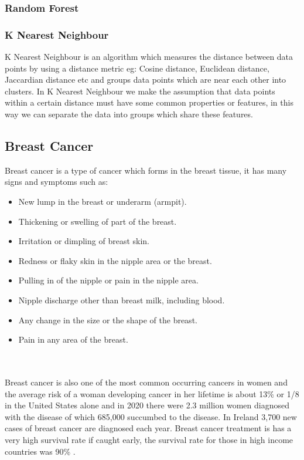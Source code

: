 \documentclass[conference]{IEEEtran}
\begin{document}
\subsubsection{Random Forest}
\subsubsection{K Nearest Neighbour}
K Nearest Neighbour is an algorithm which measures the distance between data points by using a distance metric eg: Cosine distance, Euclidean distance, Jaccardian distance etc and groups data points which are near each other into clusters.  In K Nearest Neighbour we make the assumption that data points within a certain distance must have some common properties or features, in this way we can separate the data into groups which share these features.

\subsection{Breast Cancer}
Breast cancer is a type of cancer which forms in the breast tissue, it has many signs and symptoms such as: 
\begin{itemize}
    \item New lump in the breast or underarm (armpit).
    \item Thickening or swelling of part of the breast.
    \item Irritation or dimpling of breast skin.
    \item Redness or flaky skin in the nipple area or the breast.
    \item Pulling in of the nipple or pain in the nipple area.
    \item Nipple discharge other than breast milk, including blood.
    \item Any change in the size or the shape of the breast.
    \item Pain in any area of the breast.
\end{itemize} \cite{symptomsofbreastcancer}
\\
\\
Breast cancer is also one of the most common occurring cancers in women and the average risk of a woman developing cancer in her lifetime is about 13\% or 1/8 in the United States alone\cite{howcommonisbreastcancer} and in 2020 there were 2.3 million women diagnosed with the disease of which 685,000 succumbed to the disease\cite{breastcancerstatistics}. In Ireland 3,700 new cases of breast cancer are diagnosed each year\cite{breastcancerireland}. Breast cancer treatment is has a very high survival rate if caught early, the survival rate for those in high income countries was 90\% \cite{breastcancerstatistics}.
\end{document}
